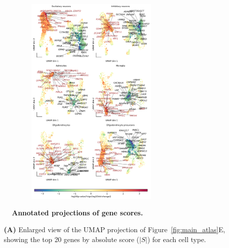 \begin{figure}[H]
    \begin{subfigure}[t]{1\textwidth}
        \caption{}
        \centering
        \includegraphics[width=0.7\textwidth]{./extended_plots/umap_projection_more_genes.png}        
    \end{subfigure}    
    \caption{
        \textbf{Annotated projections of gene scores.}\\
    }
    \label{fig:snRNAseq_gene_scores}
\end{figure}

\begin{itemize}
    \item[\textbf{(A)}] Enlarged view of the UMAP projection of Figure~\ref{fig:main_atlas}E, showing the top 20 genes by absolute score ($|S|$) for each cell type. 
\end{itemize}
